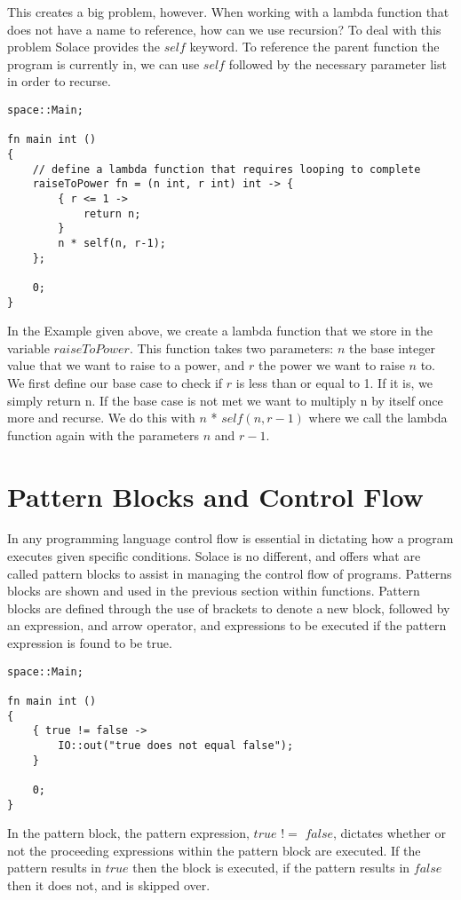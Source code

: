 \documentclass{article}
\begin{document}
This creates a big problem, however. When working with a lambda function that does not have a name to reference, how can we use recursion? To deal with this problem
Solace provides the $self$ keyword. To reference the parent function the program is currently in, we can use $self$ followed by the necessary parameter list in order
to recurse.

\begin{lstlisting}
space::Main;

fn main int ()
{
	// define a lambda function that requires looping to complete
	raiseToPower fn = (n int, r int) int -> {
		{ r <= 1 ->
			return n;
		}
		n * self(n, r-1);
	};

	0;
}
\end{lstlisting}

In the Example given above, we create a lambda function that we store in the variable $raiseToPower$. This function takes two parameters: $n$ the base integer value
that we want to raise to a power, and $r$ the power we want to raise $n$ to. We first define our base case to check if $r$ is less than or equal to 1. If it is,
we simply return n. If the base case is not met we want to multiply n by itself once more and recurse. We do this with $n$ * $self(n,r-1)$ where we call the
lambda function again with the parameters $n$ and $r-1$.


\section{Pattern Blocks and Control Flow}

In any programming language control flow is essential in dictating how a program executes given specific conditions. Solace is no different, and offers what are called
pattern blocks to assist in managing the control flow of programs. Patterns blocks are shown and used in the previous section within functions. Pattern blocks are defined
through the use of brackets to denote a new block, followed by an expression, and arrow operator, and expressions to be executed if the pattern expression is found to be true.

\begin{lstlisting}
space::Main;

fn main int ()
{
	{ true != false ->
 		IO::out("true does not equal false");
	}
 
	0;
}
\end{lstlisting}

In the pattern block, the pattern expression, $true$ $!=$ $false$, dictates whether or not the proceeding expressions within the pattern block are executed. If the pattern
results in $true$ then the block is executed, if the pattern results in $false$ then it does not, and is skipped over.
\end{document}
